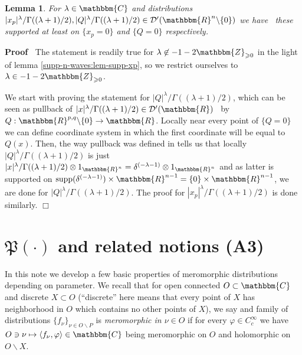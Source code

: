 \documentclass{article}
\newcommand{\nin}{\not\in}
\newcommand{\tmop}[1]{\ensuremath{\operatorname{#1}}}
\newcommand{\tmtextit}[1]{{\itshape{#1}}}
\renewenvironment{proof}{\noindent\textbf{Proof\ }}{\hspace*{\fill}$\Box$\medskip}
\newtheorem{lemma}[proposition]{Lemma}
\theoremstyle{remark}
\begin{document}
\begin{lemma}
  \label{supp-n-waves:lem-at-least}For $\lambda \in \mathbbm{C}$ and
  distributions $| x_p |^{\lambda} / \Gamma ((\lambda + 1) / 2), | Q
  |^{\lambda} / \Gamma ((\lambda + 1) / 2) \in \mathcal{D}' (\mathbbm{R}^n
  \backslash \{ 0 \})$ we have \ these supported at least on $\{ x_p = 0 \}$
  and $\{ Q = 0 \}$ respectively.
\end{lemma}

\begin{proof}
  The statement is readily true for $\lambda \nin - 1 -
  2\mathbbm{Z}_{\geqslant 0}$ in the light of lemma
  \ref{supp-n-waves:lem-supp-xp}, so we restrict ourselves to $\lambda \in - 1
  - 2\mathbbm{Z}_{\geqslant 0}$.
  
  We start with proving the statement for $| Q |^{\lambda} / \Gamma ((\lambda
  + 1) / 2)$, which can be seen as pullback of $| x |^{\lambda} / \Gamma
  ((\lambda + 1) / 2) \in \mathcal{D}' (\mathbbm{R})$ \ by $Q :
  \mathbbm{R}^{p, q} \backslash \{ 0 \} \rightarrow \mathbbm{R}$. Locally near
  every point of $\{ Q = 0 \}$ we can define coordinate system in which the
  first coordinate will be equal to $Q (x)$. Then, the way pullback was
  defined in {\cite{hormander1983analysis}} tells us that locally $| Q
  |^{\lambda} / \Gamma ((\lambda + 1) / 2)$ is just $| x |^{\lambda} / \Gamma
  ((\lambda + 1) / 2) \otimes 1_{\mathbbm{R}^n} = \delta^{(- \lambda - 1)}
  \otimes 1_{\mathbbm{R}^n}$ and as latter is supported on $\tmop{supp}
  (\delta^{(- \lambda - 1)}) \times \mathbbm{R}^{n - 1} = \{ 0 \} \times
  \mathbbm{R}^{n - 1}$, we are done for $| Q |^{\lambda} / \Gamma ((\lambda +
  1) / 2)$. The proof for $| x_p |^{\lambda} / \Gamma ((\lambda + 1) / 2)$ is
  done similarly.
\end{proof}

\section{$\mathfrak{P} (\cdot)$ and related notions (A3)}

In this note we develop a few basic properties of meromorphic distributions
depending on parameter. We recall that for open connected $O \subset
\mathbbm{C}^{}$ and discrete $X \subset O$ (``discrete'' here means that every
point of $X$ has neighborhood in $O$ which contains no other points of $X$),
we say and family of distributions $\{ f_{\nu} \}_{\nu \in O\backslash P}$ is
\tmtextit{meromorphic in $\nu \in O$} if for every $\varphi \in C_c^{\infty}$
we have $O \ni \nu \mapsto \langle f_{\nu}, \varphi \rangle \in \mathbbm{C}$
being meromorphic on $O$ and holomorphic on $O\backslash X$.
\end{document}
